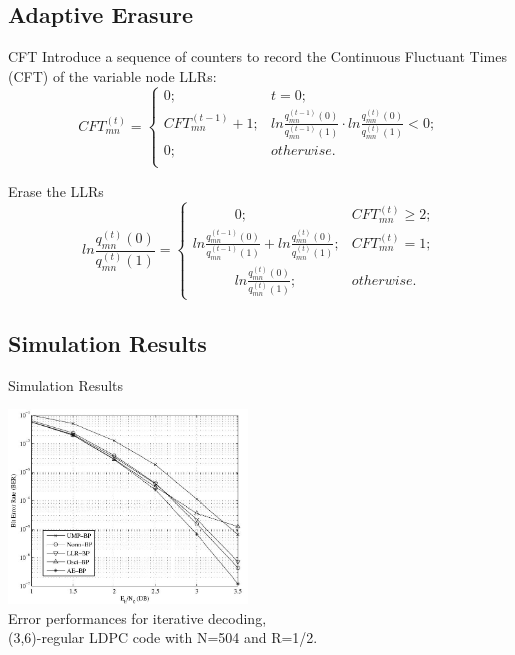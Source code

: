 \documentclass{beamer}
\begin{document}
\subsection{Adaptive Erasure}
\begin{frame}
    \begin{block}{CFT}
        Introduce a sequence of counters to record the Continuous
        Fluctuant Times (CFT) of the variable node LLRs:
        \begin{equation*}
        {CFT_{mn}^{(t)}=}
            \begin{cases}
            0; & t=0;\\
            CFT_{mn}^{(t-1)}+1 ;& ln\frac{q_{mn}^{(t-1)}(0)}{q_{mn}^{(t-1)}(1)}\cdot ln\frac{q_{mn}^{(t)}(0)}{q_{mn}^{(t)}(1)}<0;\\
            0 ;& otherwise.\\
            \end{cases}
        \end{equation*}
    \end{block}
\end{frame}
\begin{frame}
    \begin{block}{Erase the LLRs}
        \large{
        \begin{equation*}
        {ln\frac{q_{mn}^{(t)}(0)}{q_{mn}^{(t)}(1)}=}
            \begin{cases}
            \quad\quad\quad 0 ;& CFT_{mn}^{(t)} \geq 2;\\
            ln\frac{q_{mn}^{(t-1)}(0)}{q_{mn}^{(t-1)}(1)}+ln\frac{q_{mn}^{(t)}(0)}{q_{mn}^{(t)}(1)};& CFT_{mn}^{(t)}=1;\\
            \quad \quad\quad ln\frac{q_{mn}^{(t)}(0)}{q_{mn}^{(t)}(1)} ;& otherwise.
            \end{cases}
        \end{equation*}}
    \end{block}
\end{frame}

\subsection{Simulation Results}
\begin{frame}{Simulation Results}
    \begin{center}
    \includegraphics[width=2.5in]{ber252.jpg}\\
    Error performances for iterative decoding, \\(3,6)-regular LDPC code with N=504 and R=1/2.
    \end{center}
\end{frame}
\end{document}
